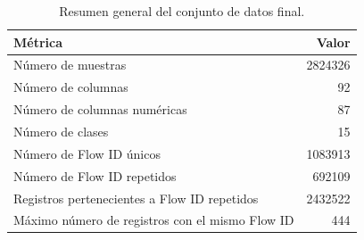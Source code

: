 \begin{table}
\caption{Resumen general del conjunto de datos final.}
\label{tab:resumen_dataset}
\begin{tabular}{lr}
\toprule
Métrica & Valor \\
\midrule
Número de muestras & 2824326 \\
Número de columnas & 92 \\
Número de columnas numéricas & 87 \\
Número de clases & 15 \\
Número de Flow ID únicos & 1083913 \\
Número de Flow ID repetidos & 692109 \\
Registros pertenecientes a Flow ID repetidos & 2432522 \\
Máximo número de registros con el mismo Flow ID & 444 \\
\bottomrule
\end{tabular}
\end{table}
